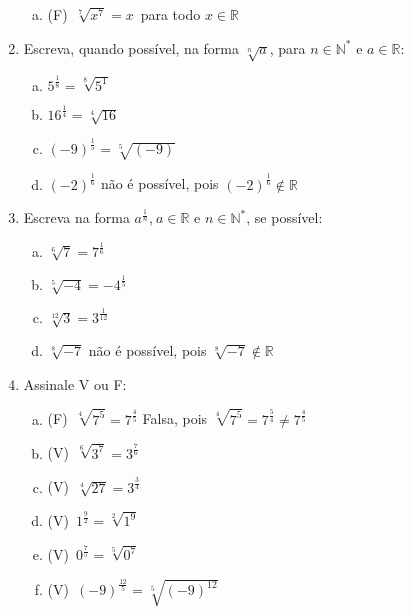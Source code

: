\documentclass[a4paper,14pt]{article}
\begin{document}
\begin{multicols}{2}
\begin{enumerate}
\begin{enumerate}[a)]
        	\item (F)~$\sqrt[7]{x^7} = x$~para todo $x \in \mathbb{R}$ \\
        \end{enumerate}
                \item Escreva, quando possível, na forma $\sqrt[n]{a}$, para $n \in \mathbb{N^*}$ e $a \in \mathbb{R}$:
        \begin{enumerate}[a)]
        	\item $5^\frac{1}{8} = \sqrt[8]{5^1}$ \\
        	\item $16^\frac{1}{4} = \sqrt[4]{16}$\\
        	\item $(-9)^\frac{1}{5} = \sqrt[5]{(-9)}$ \\
        	\item $(-2)^\frac{1}{6}$ não é possível, pois $(-2)^\frac{1}{6} \notin \mathbb{R}$\\
        \end{enumerate}
        \item Escreva na forma $a^\frac{1}{n}$,$~a \in \mathbb{R}$ e $n \in \mathbb{N^*}$, se possível:
        \begin{enumerate}[a)]
        	\item $\sqrt[6]{7} = 7^\frac{1}{6}$\\
        	\item $\sqrt[5]{-4} = -4^\frac{1}{5}$\\
        	\item $\sqrt[12]{3} = 3^\frac{1}{12}$\\
        	\item $\sqrt[8]{-7}$ não é possível, pois $\sqrt[8]{-7} \notin \mathbb{R}$\\
        \end{enumerate}
        \item Assinale V ou F:
        \begin{enumerate}[a)]
        	\item (F)~$\sqrt[4]{7^5} = 7^\frac{4}{5}$ Falsa, pois $\sqrt[4]{7^5} = 7^\frac{5}{4} \neq 7^\frac{4}{5}$
        	\item (V)~$\sqrt[6]{3^7} = 3^\frac{7}{6}$
        	\item (V)~$\sqrt[4]{27} = 3^\frac{3}{4}$
        	\item (V)~$1^\frac{9}{2} = \sqrt[2]{1^9}$
        	\item (V)~$0^\frac{7}{5} = \sqrt[5]{0^7}$
        	\item (V)~$(-9)^\frac{12}{5} = \sqrt[5]{(-9)^12}$

\end{enumerate}
\end{enumerate}
\end{multicols}
\end{document}

